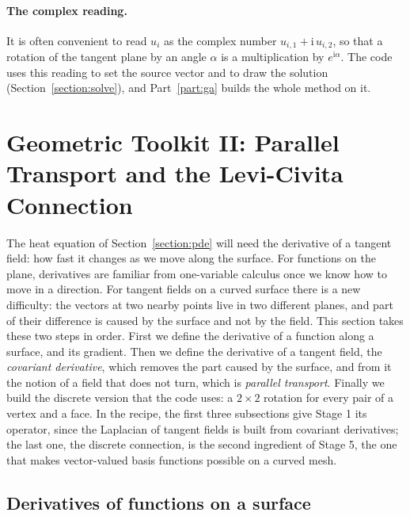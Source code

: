 \paragraph{The complex reading.} It is often convenient to read $u_i$ as the complex number $u_{i,1} + \mathrm{i}\, u_{i,2}$, so that a rotation of the tangent plane by an angle $\alpha$ is a multiplication by $e^{\mathrm i \alpha}$. The code uses this reading to set the source vector and to draw the solution (Section~\ref{section:solve}), and Part~\ref{part:ga} builds the whole method on it.

\section{Geometric Toolkit II: Parallel Transport and the Levi-Civita Connection}
\label{section:transport}

The heat equation of Section~\ref{section:pde} will need the derivative of a tangent field: how fast it changes as we move along the surface. For functions on the plane, derivatives are familiar from one-variable calculus once we know how to move in a direction. For tangent fields on a curved surface there is a new difficulty: the vectors at two nearby points live in two different planes, and part of their difference is caused by the surface and not by the field. This section takes these two steps in order. First we define the derivative of a function along a surface, and its gradient. Then we define the derivative of a tangent field, the \emph{covariant derivative}, which removes the part caused by the surface, and from it the notion of a field that does not turn, which is \emph{parallel transport}. Finally we build the discrete version that the code uses: a $2 \times 2$ rotation for every pair of a vertex and a face. In the recipe, the first three subsections give Stage 1 its operator, since the Laplacian of tangent fields is built from covariant derivatives; the last one, the discrete connection, is the second ingredient of Stage 5, the one that makes vector-valued basis functions possible on a curved mesh.

\subsection{Derivatives of functions on a surface}

